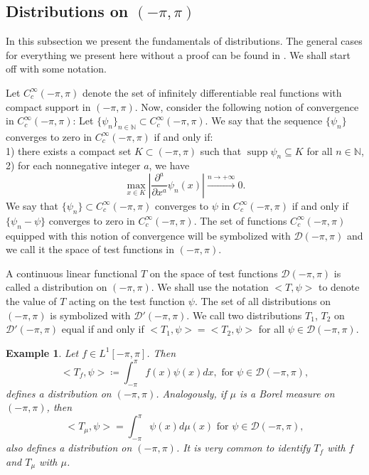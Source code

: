 \documentclass[11pt]{amsart}
\newtheorem{example}[theorem]{Example}
\numberwithin{equation}{section}
\begin{document}
\subsection{Distributions on \texorpdfstring{\((-\pi,\pi)\)}{TEXT}} In this subsection we present the fundamentals of distributions. The general cases for everything we present here without a proof can be found in \cite[Chapter 9]{Folland}. We shall start off with some notation.
\par Let \(C_c^\infty(-\pi,\pi)\) denote the set of infinitely differentiable real functions with compact support in \((-\pi,\pi)\). Now, consider the following notion of convergence in \(C_c^\infty(-\pi,\pi)\): Let \(\{\psi_n\}_{n\in\mathbb{N}}\subset C_c^\infty(-\pi,\pi)\). We say that the sequence \(\{\psi_n\}\) converges to zero in \(C_c^\infty(-\pi,\pi)\) if and only if:\\
1) there exists a compact set \(K\subset(-\pi,\pi)\) such that \(\operatorname{supp}\psi_n\subseteq K\) 
for all \(n\in\mathbb{N}\),\\
2) for each nonnegative integer \(a\), we have
\[\max_{x\in K}\left|\frac{\partial^{a}}{\partial x^{a}}\psi_n(x)\right|\xrightarrow{n\to+\infty}0.\]
We say that \(\{\psi_n\}\subset C_c^\infty(-\pi,\pi)\) converges to \(\psi\) in \(C_c^\infty(-\pi,\pi)\) if and only if \(\{\psi_n-\psi\}\) converges to zero in \(C_c^\infty(-\pi,\pi)\). The set of functions \(C_c^\infty(-\pi,\pi)\) equipped with this notion of convergence will be symbolized with \(\mathcal{D}(-\pi,\pi)\) and we call it the space of test functions in \((-\pi,\pi)\).
\par A continuous linear functional \(T\) on the space of test functions \(\mathcal{D}(-\pi,\pi)\) is called a distribution on \((-\pi,\pi).\) We shall use the notation \(<T,\psi>\) to denote the value of \(T\) acting on the test function \(\psi\). The set of all distributions on \((-\pi,\pi)\) is symbolized with \(\mathcal{D}'(-\pi,\pi)\). We call two distributions \(T_1\), \(T_2\) on \(\mathcal{D}'(-\pi,\pi)\) equal if and only if \(<T_1,\psi>=<T_2,\psi>\) for all \(\psi\in\mathcal{D}(-\pi,\pi).\)
\begin{example} \textnormal{Let \(f\in L^1[-\pi,\pi]\). Then \[<T_f,\psi>\coloneqq\int_{-\pi}^\pi f(x)\psi(x)dx,\text{ for }\psi\in\mathcal{D}(-\pi,\pi),\]
defines a distribution on \((-\pi,\pi)\). Analogously, if \(\mu\) is a Borel measure on \((-\pi,\pi)\), then
\[<T_\mu,\psi>=\int_{-\pi}^\pi\psi(x) d\mu(x)\text{ for }\psi\in\mathcal{D}(-\pi,\pi),\]
also defines a distribution on \((-\pi,\pi)\). It is very common to identify \(T_f\) with \(f\) and \(T_\mu\) with \(\mu\).}
\end{example}
\end{document}
